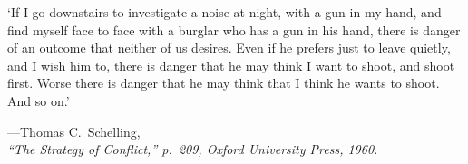 \vspace*{2.2cm}

\noindent `If I go downstairs to investigate a noise at night, with a gun in my hand, and find myself face to face with a burglar who has a gun in his hand, there is danger of an outcome that neither of us desires. Even if he prefers just to leave quietly, and I wish him to, there is danger that he may think I want to shoot, and shoot first. Worse there is danger that he may think that I think he wants to shoot. And so on.'
\begin{flushright}
---Thomas C.~Schelling,\\
\emph{``The Strategy of Conflict,'' p.~209, Oxford University Press, 1960.}
\end{flushright}
